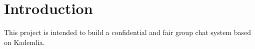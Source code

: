 \chapter{Introduction}\label{cha:introduction}

This project is intended to build a confidential and fair group chat system based on Kademlia.

%
%
%
%
%
